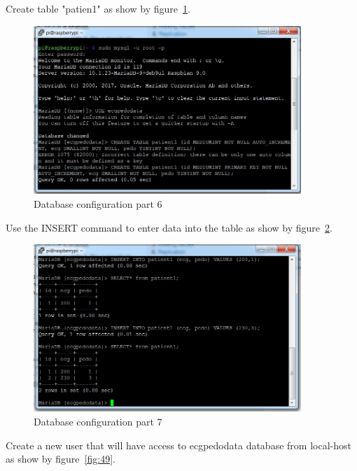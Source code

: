 \documentclass[12pt,]{article}
\begin{document}
Create table "patien1" as show by figure~\ref{fig:47}.
\begin{figure}[H]
  	\begin{center}
    	\includegraphics[width=0.9\textwidth]{Ras_31}
  	\end{center}
  	\caption{Database configuration part 6}
	\label{fig:47}
\end{figure}
Use the INSERT command to enter data into the table as show by figure~\ref{fig:48}.
\begin{figure}[H]
  	\begin{center}
    	\includegraphics[width=0.9\textwidth]{Ras_32}
  	\end{center}
  	\caption{Database configuration part 7}
	\label{fig:48}
\end{figure}
Create a new user that will have access to ecgpedodata database from local-host as show by figure~\ref{fig:49}.
\end{document}
